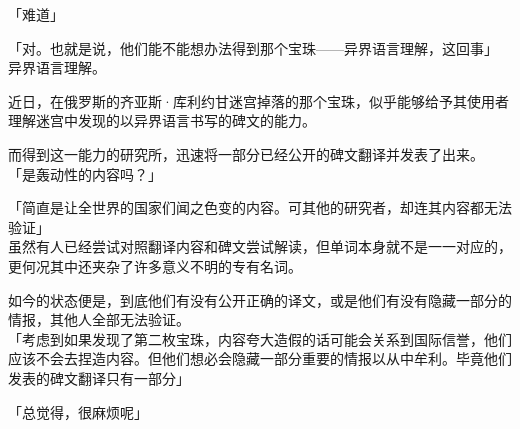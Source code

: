 「难道」

「对。也就是说，他们能不能想办法得到那个宝珠——异界语言理解，这回事」\\

异界语言理解。

近日，在俄罗斯的齐亚斯·库利约甘迷宫掉落的那个宝珠，似乎能够给予其使用者理解迷宫中发现的以异界语言书写的碑文的能力。

而得到这一能力的研究所，迅速将一部分已经公开的碑文翻译并发表了出来。\\

「是轰动性的内容吗？」

「简直是让全世界的国家们闻之色变的内容。可其他的研究者，却连其内容都无法验证」\\

虽然有人已经尝试对照翻译内容和碑文尝试解读，但单词本身就不是一一对应的，更何况其中还夹杂了许多意义不明的专有名词。

如今的状态便是，到底他们有没有公开正确的译文，或是他们有没有隐藏一部分的情报，其他人全部无法验证。\\

「考虑到如果发现了第二枚宝珠，内容夸大造假的话可能会关系到国际信誉，他们应该不会去捏造内容。但他们想必会隐藏一部分重要的情报以从中牟利。毕竟他们发表的碑文翻译只有一部分」

「总觉得，很麻烦呢」\\


